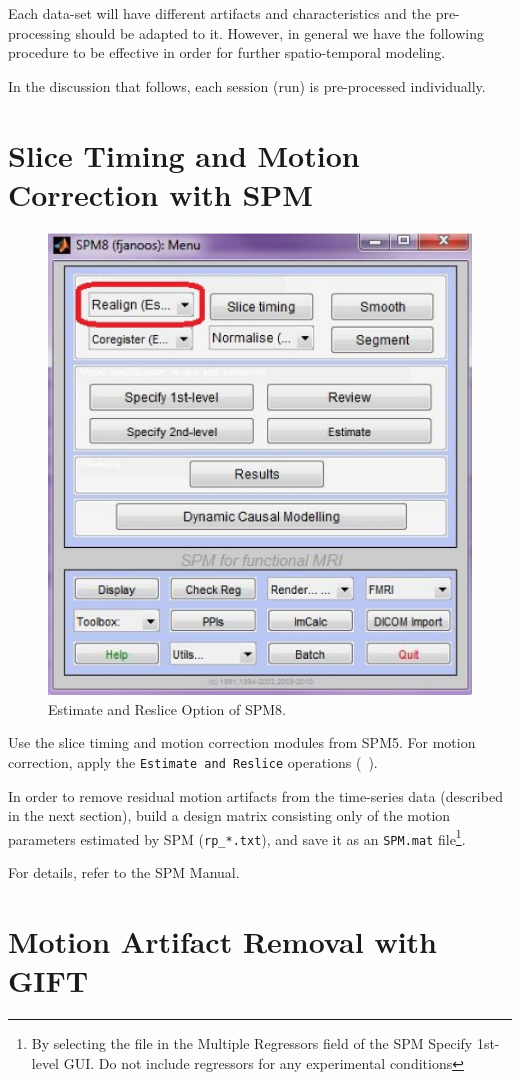 Each data-set will have different artifacts and characteristics and
the pre-processing should be adapted to it. However, in general we
have the following procedure to be effective in order for further
spatio-temporal modeling.

In the discussion that follows, each session (run) is pre-processed
individually.

\section{Slice Timing and Motion Correction with SPM}
\label{sec:slc-tim}

\begin{figure}
    \begin{center}
   \includegraphics[width=.37\linewidth]{figures/spm-est_res}
    \caption[Estimate and Reslice Option of SPM8.]
    {Estimate and Reslice Option of SPM8.\label{fig:spm-est_res}}
    \end{center}
\end{figure}
Use the slice timing and motion correction modules from SPM5. For
motion correction, apply the \verb"Estimate and Reslice" operations
(\cf~).

In order to remove residual motion artifacts from the time-series
data (described in the next section), build a design matrix
consisting only of the motion parameters estimated by SPM
(\verb"rp_*.txt"), and save it as an \verb"SPM.mat" file\footnote{By
selecting the file in the { Multiple Regressors} field of the SPM {
Specify 1st-level} GUI. Do not include regressors for any
experimental conditions}.

For details, refer to the SPM Manual\cite{TheFILMethodsGroup2011}.

\section{Motion Artifact Removal with GIFT}

